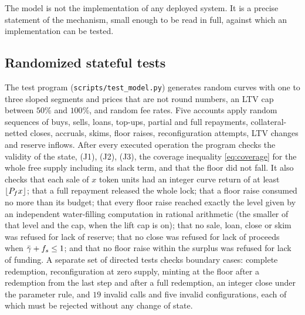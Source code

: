 The model is not the implementation of any deployed system. It is a precise statement of the mechanism, small enough to be read in full, against which an implementation can be tested.

\subsection{Randomized stateful tests}

The test program (\texttt{scripts/test\_model.py}) generates random curves with one to three sloped segments and prices that are not round numbers, an LTV cap between $50\%$ and $100\%$, and random fee rates. Five accounts apply random sequences of buys, sells, loans, top-ups, partial and full repayments, collateral-netted closes, accruals, skims, floor raises, reconfiguration attempts, LTV changes and reserve inflows. After every executed operation the program checks the validity of the state, (J1), (J2), (J3), the coverage inequality \eqref{eq:coverage} for the whole free supply including its slack term, and that the floor did not fall. It also checks that each sale of $x$ token units had an integer curve return of at least $\lfloor P_f x\rfloor$; that a full repayment released the whole lock; that a floor raise consumed no more than its budget; that every floor raise reached exactly the level given by an independent water-filling computation in rational arithmetic (the smaller of that level and the cap, when the lift cap is on); that no sale, loan, close or skim was refused for lack of reserve; that no close was refused for lack of proceeds when $\bar\gamma+f_s\le1$; and that no floor raise within the surplus was refused for lack of funding. A separate set of directed tests checks boundary cases: complete redemption, reconfiguration at zero supply, minting at the floor after a redemption from the last step and after a full redemption, an integer close under the parameter rule, and $19$ invalid calls and five invalid configurations, each of which must be rejected without any change of state.

